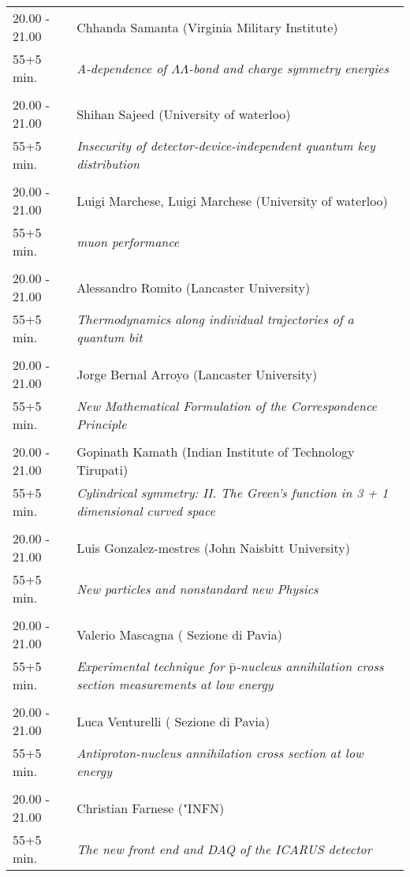 \begin{longtable}{p{3cm}p{13cm}}
20.00 - 21.00 & Chhanda Samanta (Virginia Military Institute)\\ 
55+5 min. & {\it A-dependence of $\Lambda\Lambda$-bond and charge symmetry energies}\\ 
 & \\ 
20.00 - 21.00 & Shihan Sajeed (University of waterloo)\\ 
55+5 min. & {\it Insecurity of detector-device-independent quantum key distribution}\\ 
 & \\ 
20.00 - 21.00 & Luigi Marchese, Luigi Marchese (University of waterloo)\\ 
55+5 min. & {\it muon performance}\\ 
 & \\ 
20.00 - 21.00 & Alessandro Romito (Lancaster University)\\ 
55+5 min. & {\it Thermodynamics along individual trajectories of a quantum bit}\\ 
 & \\ 
20.00 - 21.00 & Jorge Bernal Arroyo (Lancaster University)\\ 
55+5 min. & {\it New Mathematical Formulation of the Correspondence Principle}\\ 
 & \\ 
20.00 - 21.00 & Gopinath Kamath (Indian Institute of Technology Tirupati)\\ 
55+5 min. & {\it Cylindrical symmetry: II. The Green’s function in 3 + 1 dimensional curved space}\\ 
 & \\ 
20.00 - 21.00 & Luis Gonzalez-mestres (John Naisbitt University)\\ 
55+5 min. & {\it New particles and nonstandard new Physics}\\ 
 & \\ 
20.00 - 21.00 & Valerio Mascagna ( Sezione di Pavia)\\ 
55+5 min. & {\it Experimental technique for $\mathrm{\bar{p}}$-nucleus annihilation cross section measurements at low energy}\\ 
 & \\ 
20.00 - 21.00 & Luca Venturelli ( Sezione di Pavia)\\ 
55+5 min. & {\it Antiproton-nucleus annihilation cross section at low energy}\\ 
 & \\ 
20.00 - 21.00 & Christian Farnese ("INFN)\\ 
55+5 min. & {\it The new front end and DAQ of the ICARUS detector}\\ 

\end{longtable}
